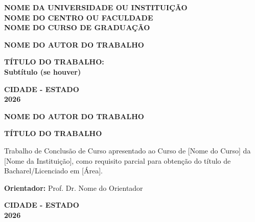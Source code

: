 \documentclass[12pt, a4paper]{article}
\begin{document}
\begin{titlepage}
    \begin{center}
        {\large \textbf{NOME DA UNIVERSIDADE OU INSTITUIÇÃO}} \\
        {\large \textbf{NOME DO CENTRO OU FACULDADE}} \\
        {\large \textbf{NOME DO CURSO DE GRADUAÇÃO}}
        
        \vspace{4cm} %
        
        {\large \textbf{NOME DO AUTOR DO TRABALHO}}
        
        \vfill %
        
        {\LARGE \textbf{TÍTULO DO TRABALHO:}}\\
        {\Large \textbf{Subtítulo (se houver)}}
        
        \vfill %
        
        {\large \textbf{CIDADE - ESTADO}} \\
        {\large \textbf{2026}}
        
    \end{center}
\end{titlepage}

\newpage
\begin{center}
    {\large \textbf{NOME DO AUTOR DO TRABALHO}}
    
    \vspace{4cm}
    
    {\LARGE \textbf{TÍTULO DO TRABALHO}}
    
    \vspace{2cm}
    
    \hspace{.45\textwidth} %
    \begin{minipage}{.5\textwidth}
        Trabalho de Conclusão de Curso apresentado ao Curso de [Nome do Curso] da [Nome da Instituição], como requisito parcial para obtenção do título de Bacharel/Licenciado em [Área].
        
        \vspace{0.5cm}
        \textbf{Orientador:} Prof. Dr. Nome do Orientador
    \end{minipage}

    \vfill
    
    {\large \textbf{CIDADE - ESTADO}} \\
    {\large \textbf{2026}}

\end{center}
\end{document}
